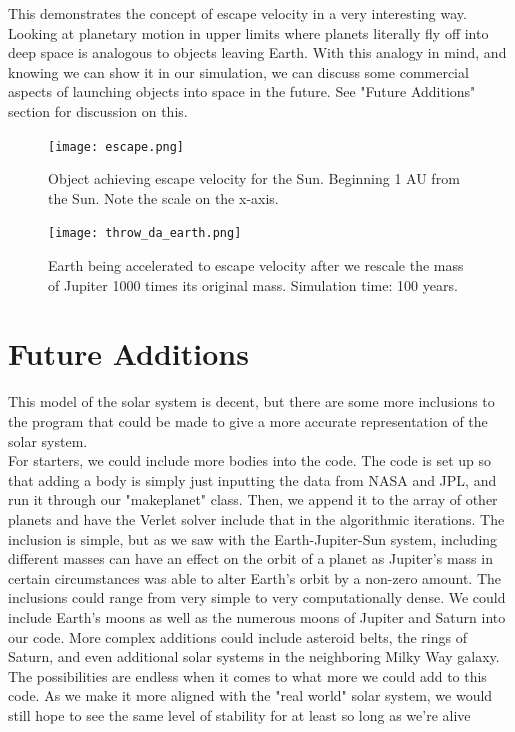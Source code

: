 \documentclass{article}
\begin{document}
This demonstrates the concept of escape velocity in a very interesting way. Looking at planetary motion in upper limits where planets literally fly off into deep space is analogous to objects leaving Earth. With this analogy in mind, and knowing we can show it in our simulation, we can discuss some commercial aspects of launching objects into space in the future. See "Future Additions" section for discussion on this.

\begin{figure}[h!]
\centering
\texttt{[image: escape.png]}
\caption{Object achieving escape velocity for the Sun. Beginning 1 AU from the Sun. Note the scale on the x-axis.}
\label{escape}
\end{figure}


\begin{figure}[h!]
\centering
\texttt{[image: throw\_da\_earth.png]}
\caption{Earth being accelerated to escape velocity after we rescale the mass of Jupiter 1000 times its original mass. Simulation time: 100 years.}
\label{earth go bye bye}
\end{figure}

\section{Future Additions}
This model of the solar system is decent, but there are some more inclusions to the program that could be made to give a more accurate representation of the solar system.\\

For starters, we could include more bodies into the code. The code is set up so that adding a body is simply just inputting the data from NASA and JPL, and run it through our "makeplanet" class. Then, we append it to the array of other planets and have the Verlet solver include that in the algorithmic iterations. The inclusion is simple, but as we saw with the Earth-Jupiter-Sun system, including different masses can have an effect on the orbit of a planet as Jupiter's mass in certain circumstances was able to alter Earth's orbit by a non-zero amount. The inclusions could range from very simple to very computationally dense. We could include Earth's moons as well as the numerous moons of Jupiter and Saturn into our code. More complex additions could include asteroid belts, the rings of Saturn, and even additional solar systems in the neighboring Milky Way galaxy. The possibilities are endless when it comes to what more we could add to this code. As we make it more aligned with the "real world" solar system, we would still hope to see the same level of stability for at least so long as we're alive\\
\end{document}

